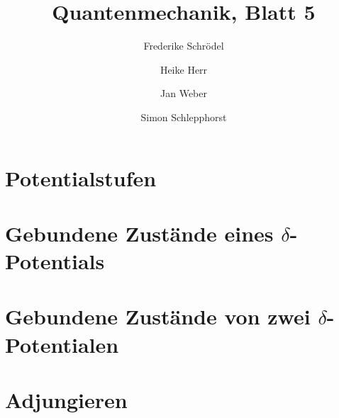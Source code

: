 \documentclass[11pt, ngerman, fleqn, DIV=15, headinclude]{scrartcl}
\title{Quantenmechanik, Blatt 5}
\author{
    Frederike Schrödel \and Heike Herr \and Jan Weber \and Simon Schlepphorst
}
\begin{document}
\maketitle

\section{Potentialstufen}

\section{Gebundene Zustände eines $\delta$-Potentials}

\section{Gebundene Zustände von zwei $\delta$-Potentialen}

\section{Adjungieren}
\end{document}
